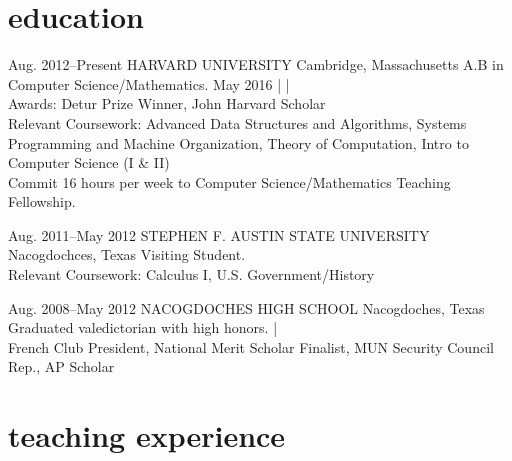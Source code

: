 \documentclass[]{friggeri-cv} %
\begin{document}

\section{education}

\entry
{Aug. 2012--Present}
{HARVARD UNIVERSITY}
{Cambridge, Massachusetts}
{A.B in Computer Science/Mathematics. 
May 2016 |
 | 
\\
Awards: Detur Prize Winner, John Harvard Scholar \\
Relevant Coursework: Advanced Data Structures and Algorithms,  Systems Programming and Machine Organization, Theory of Computation, Intro to Computer Science (I \& II)\\
Commit 16 hours per week to Computer Science/Mathematics Teaching Fellowship.\\
}
\begin{detailed}

\entry
{Aug. 2011--May 2012}
{STEPHEN F. AUSTIN STATE UNIVERSITY}
{Nacogdochces, Texas}
{Visiting Student. \\
Relevant Coursework: Calculus I, U.S. Government/History \\
}
\end{detailed}

\entry
{Aug. 2008--May 2012}
{NACOGDOCHES HIGH SCHOOL}
{Nacogdoches, Texas}
{Graduated valedictorian with high honors.  | \\
French Club President, National Merit Scholar Finalist, MUN Security Council Rep., AP Scholar}


\section{teaching experience}
\end{document}
